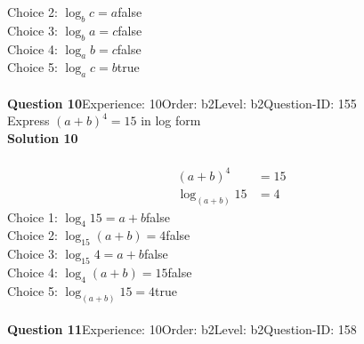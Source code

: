 \documentclass{article}
\begin{document}
Choice 2: \hspace{20pt}$\log_bc=a$\hspace{20pt}false\\
Choice 3: \hspace{20pt}$\log_ba=c$\hspace{20pt}false\\
Choice 4: \hspace{20pt}$\log_ab=c$\hspace{20pt}false\\
Choice 5: \hspace{20pt}$\log_ac=b$\hspace{20pt}true\\
\\[4pt]
\noindent\textbf{Question 10}\hspace{20pt}Experience: 10\hspace{20pt}Order: b2\hspace{20pt}Level: b2\hspace{20pt}Question-ID: 155\\[2pt]
Express $(a+b)^4=15$ in log form\\[4pt]
\noindent\textbf{Solution 10}\\[2pt]
\\[-35pt]\begin{align*}
(a+b)^4&=15\\[2pt]
\log_{(a+b)}15&=4
\end{align*}
Choice 1: \hspace{20pt}$\log_{4}15=a+b$\hspace{20pt}false\\
Choice 2: \hspace{20pt}$\log_{15}(a+b)=4$\hspace{20pt}false\\
Choice 3: \hspace{20pt}$\log_{15}4=a+b$\hspace{20pt}false\\
Choice 4: \hspace{20pt}$\log_{4}(a+b)=15$\hspace{20pt}false\\
Choice 5: \hspace{20pt}$\log_{(a+b)}15=4$\hspace{20pt}true\\
\\[4pt]
\noindent\textbf{Question 11}\hspace{20pt}Experience: 10\hspace{20pt}Order: b2\hspace{20pt}Level: b2\hspace{20pt}Question-ID: 158\\[2pt]
\end{document}
